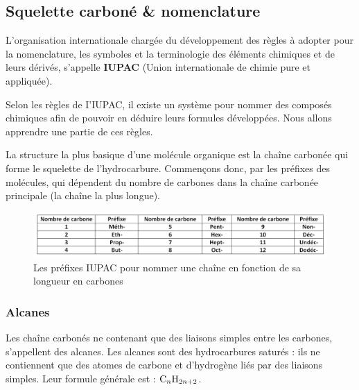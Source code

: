 \documentclass[11pt,a4paper]{article}
\begin{document}
\subsection{Squelette carboné \& nomenclature}

L'organisation internationale chargée du développement des règles à adopter pour la nomenclature, les symboles et la terminologie des éléments chimiques et de leurs dérivés, s'appelle \textbf{IUPAC} (Union internationale de chimie pure et appliquée). 

Selon les règles de I’IUPAC, il existe un système pour nommer des composés chimiques afin de pouvoir en déduire leurs formules développées. Nous allons apprendre une partie de ces règles. 

La structure la plus basique d'une molécule organique est la chaîne carbonée qui forme le squelette de l'hydrocarbure. Commençons donc, par les préfixes des molécules, qui dépendent du nombre de carbones dans la chaîne carbonée principale (la chaîne la plus longue). 

\begin{figure}[h]
    \centering
    \includegraphics[width=\linewidth]{imgs/c5/prefixe.jpg}
    \caption{Les préfixes IUPAC pour nommer une chaîne en fonction de sa longueur en carbones}
    \label{fig:prefixes}
\end{figure}

\subsubsection{Alcanes}
Les chaîne carbonés ne contenant que des liaisons simples entre les carbones, s'appellent des alcanes. Les alcanes sont des hydrocarbures saturés : ils ne contiennent que des atomes de carbone et d’hydrogène liés par des liaisons simples.  Leur formule générale est : $\ce{C_nH_{2n+2}}$.
\end{document}
